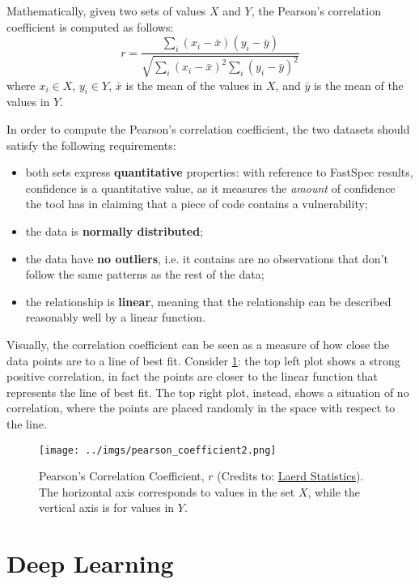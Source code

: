 \documentclass[12pt,a4paper]{book}
\theoremstyle{definition}
\begin{document}
	Mathematically, given two sets of values $X$ and $Y$, the Pearson's correlation coefficient is computed as follows:
	\[
	r = \frac{\sum_i(x_i-\bar{x})(y_i-\bar{y})}{\sqrt{\sum_i(x_i-\bar{x})^2\sum_i(y_i-\bar{y})^2}}
	\]
	where $x_i\in X$, $y_i\in Y$, $\bar{x}$ is the mean of the values in $X$, and $\bar{y}$ is the mean of the values in $Y$. 
	
	In order to compute the Pearson's correlation coefficient, the two datasets should satisfy the following requirements:
	\begin{itemize}
		\item both sets express \textbf{quantitative} properties: with reference to FastSpec results, confidence is a quantitative value, as it measures the \textit{amount} of confidence the tool has in claiming that a piece of code contains a vulnerability;
		\item the data is \textbf{normally distributed};
		\item the data have \textbf{no outliers}, i.e. it contains are no observations that don’t follow the same patterns as the rest of the data;
		\item the relationship is \textbf{linear}, meaning that the relationship can be described reasonably well by a linear function.
	\end{itemize}
	
	Visually, the correlation coefficient can be seen as a measure of how close the data points are to a line of best fit. Consider \ref{fig:pearson}: the top left plot shows a strong positive correlation, in fact the points are closer to the linear function that represents the line of best fit. The top right plot, instead, shows a situation of no correlation, where the points are placed randomly in the space with respect to the line.
	
	\begin{figure}
		\centering
		\texttt{[image: ../imgs/pearson\_coefficient2.png]}
		\captionsetup{width=0.7\textwidth}
		\caption{Pearson's Correlation Coefficient, $r$ (Credits to: \href{https://statistics.laerd.com/statistical-guides/pearson-correlation-coefficient-statistical-guide.php}{Laerd Statistics}). The horizontal axis corresponds to values in the set $X$, while the vertical axis is for values in $Y$.}
		\label{fig:pearson}
	\end{figure}
	
	\chapter{Deep Learning}\label{appendix:dl}
\end{document}
